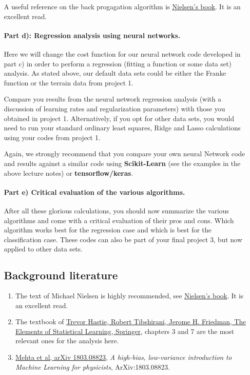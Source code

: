\documentclass[%
oneside,                 %
final,                   %
10pt]{article}
\begin{document}
A useful reference on the back progagation algorithm is \href{{http://neuralnetworksanddeeplearning.com/}}{Nielsen's
book}. It is an excellent
read.


\paragraph{Part d): Regression analysis using neural networks.}
Here we will change the cost function for our neural network code
developed in part c) in order to perform a regression (fitting a
function or some data set) analysis. As stated above, our default data
sets could be either the Franke function or the terrain data from
project 1.

Compare you results from the neural network regression analysis (with a discussion of learning rates and regularization parameters)
with those you obtained in project 1. Alternatively, if you opt for other data sets, you would need to run your standard ordinary least squares, Ridge and Lasso calculations using your codes from project 1.

Again, we strongly recommend that you compare your own neural Network code and results against a similar code using \textbf{Scikit-Learn} (see the examples in the above lecture notes) or \textbf{tensorflow/keras}. 



\paragraph{Part e) Critical evaluation of the various algorithms.}
After all these glorious calculations, you should now summarize the
various algorithms and come with a critical evaluation of their pros
and cons. Which algorithm works best for the regression case and which
is best for the classification case. These codes can also be part of
your final project 3, but now applied to other data sets.




\subsection*{Background literature}

\begin{enumerate}
\item The text of Michael Nielsen is highly recommended, see \href{{http://neuralnetworksanddeeplearning.com/}}{Nielsen's book}. It is an excellent read.

\item The textbook of \href{{https://www.springer.com/gp/book/9780387848570}}{Trevor Hastie, Robert Tibshirani, Jerome H. Friedman, The Elements of Statistical Learning, Springer}, chapters 3 and 7 are the most relevant ones for the analysis here. 

\item \href{{https://arxiv.org/abs/1803.08823}}{Mehta et al, arXiv 1803.08823}, \emph{A high-bias, low-variance introduction to Machine Learning for physicists}, ArXiv:1803.08823.
\end{enumerate}
\end{document}

